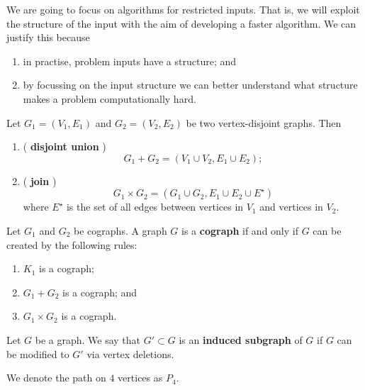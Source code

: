 We are going to focus on algorithms for restricted inputs.
That is, we will exploit the structure of the input with the
aim of developing a faster algorithm.
We can justify this because
\begin{enumerate}
    \item in practise, problem inputs have a structure; and
    \item by focussing on the input structure we can better understand
        what structure makes a problem computationally hard.
\end{enumerate}

\begin{definition}
    Let $G_1 = (V_1, E_1)$ and $G_2 = (V_2, E_2)$ be two vertex-disjoint graphs.
    Then
    \begin{enumerate}
        \item ( \textbf{disjoint union} )
            \[
                G_1 + G_2 = (V_1 \cup V_2, E_1 \cup E_2);
            \]

        \item ( \textbf{join} )
            \[
                G_1 \times G_2 = (G_1 \cup G_2, E_1 \cup E_2 \cup E^\star)
            \]
            where $E^\star$ is the set of all edges
            between vertices in $V_1$ and vertices in $V_2$.
    \end{enumerate}
\end{definition}

\begin{definition}[Cograph]
    Let $G_1$ and $G_2$ be cographs.
    A graph $G$ is a \textbf{cograph} if and only if $G$ can be created
    by the following rules:
    \begin{enumerate}
        \item $K_1$ is a cograph;
        \item $G_1 + G_2$ is a cograph; and
        \item $G_1 \times G_2$ is a cograph.
    \end{enumerate}
\end{definition}

\begin{definition}
    Let $G$ be a graph.
    We say that $G' \subset G$ is an
    \textbf{induced subgraph} of
    $G$ if $G$ can be modified to $G'$ via vertex deletions.
\end{definition}

\begin{definition}[$P_4$]
    We denote the path on $4$ vertices as $P_4$.
\end{definition}

